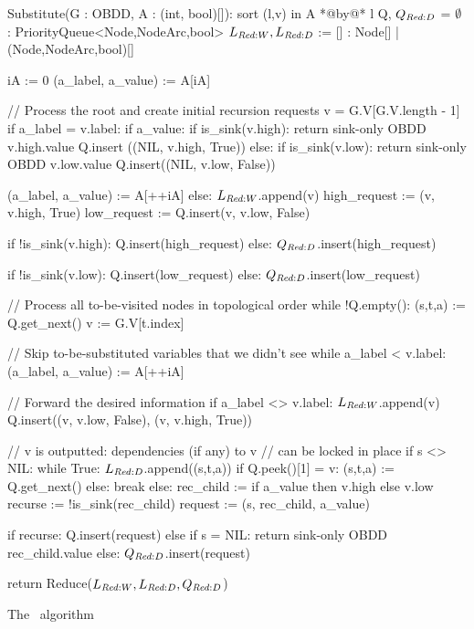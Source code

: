 \begin{lstfloat}
  \centering

  \begin{blstlisting}
  Substitute(G : OBDD, A : (int, bool)[]):
      sort (l,v) in A *@by@* l
      Q, $\ReduceQdep$ = $\emptyset$ : PriorityQueue<Node,NodeArc,bool>
      $\ReduceLwork, \ReduceLdep$ := [] : Node[] | (Node,NodeArc,bool)[]

      iA := 0
      (a_label, a_value) := A[iA]

      // Process the root and create initial recursion requests
      v = G.V[G.V.length - 1]
      if a_label = v.label:
          if a_value:
              if is_sink(v.high): return sink-only OBDD v.high.value
              Q.insert ((NIL, v.high, True))
          else:
              if is_sink(v.low): return sink-only OBDD v.low.value
              Q.insert((NIL, v.low, False))

          (a_label, a_value) := A[++iA]
      else:
          $\ReduceLwork$.append(v)
          high_request := (v, v.high, True)
          low_request := Q.insert(v, v.low, False)

          if !is_sink(v.high): Q.insert(high_request)
          else: $\ReduceQdep$.insert(high_request)

          if !is_sink(v.low):  Q.insert(low_request)
          else: $\ReduceQdep$.insert(low_request)

      // Process all to-be-visited nodes in topological order
      while !Q.empty():
          (s,t,a) := Q.get_next()
          v := G.V[t.index]

          // Skip to-be-substituted variables that we didn't see
          while a_label < v.label: (a_label, a_value) := A[++iA]

          // Forward the desired information
          if a_label <> v.label:
              $\ReduceLwork$.append(v)
              Q.insert((v, v.low, False), (v, v.high, True))

              // v is outputted: dependencies (if any) to v
              // can be locked in place
              if s <> NIL:
                  while True:
                      $\ReduceLdep$.append((s,t,a))
                      if Q.peek()[1] = v: (s,t,a) := Q.get_next()
                      else: break
          else:
              rec_child := if a_value then v.high else v.low
              recurse := !is_sink(rec_child)
              request := (s, rec_child, a_value)

              if recurse: Q.insert(request)
              else if s = NIL: return sink-only OBDD rec_child.value
              else: $\ReduceQdep$.insert(request)

      return Reduce($\ReduceLwork, \ReduceLdep, \ReduceQdep$)
  \end{blstlisting}

  \caption{The \Substitute\ algorithm}
  \label{lst:substitute}
\end{lstfloat}

